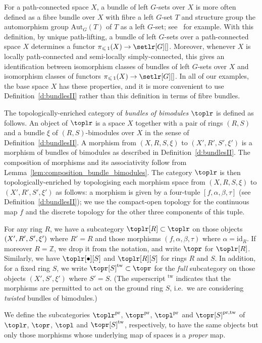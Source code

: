 \documentclass[AHL,Unicode,published]{cedram}
\newcommand{\Aut}{\mathrm{Aut}}
\newcommand{\pr}{\ensuremath{\mathrm{pr}}}
\newcommand{\id}{\mathrm{id}}
\newcommand{\tw}{\mathrm{tw}}
\newcommand{\bZ}{\mathbb{Z}}
\renewcommand{\leq}{\leqslant}
\begin{document}
\begin{rema}\label{r:bundles}
For a path-connected space $X$, a bundle of left $G$-sets over $X$ is more often defined as a fibre bundle over $X$ with fibre a left $G$-set $T$ and structure group the automorphism group $\Aut_G(T)$ of $T$ as a left $G$-set; see~\cite[\S~2]{Steenrod1951} for example. With this definition, by unique path-lifting, a bundle of left $G$-sets over a path-connected space $X$ determines a functor $\pi_{\leq\,1}(X) \to \setlr[G][]$. Moreover, whenever $X$ is locally path-connected and semi-locally simply-connected, this gives an identification between isomorphism classes of bundles of left $G$-sets over $X$ and isomorphism classes of functors $\pi_{\leq\,1}(X) \to \setlr[G][]$. In all of our examples, the base space $X$ has these properties, and it is more convenient to use Definition~\ref{d:bundlesII} rather than this definition in terms of fibre bundles.
\end{rema}

\begin{defi}\label{def:bundles_of_bimodules}
The topologically-enriched category of \emph{bundles of bimodules} $\toplr$ is defined as follows. An object of $\toplr$ is a space $X$ together with a pair of rings $(R,S)$ and a bundle $\xi$ of $(R,S)$-bimodules over $X$ in the sense of Definition~\ref{d:bundlesII}. A morphism from $(X,R,S,\xi)$ to $(X',R',S',\xi')$ is a morphism of bundles of bimodules as described in Definition~\ref{d:bundlesII}. The composition of morphisms and its associativity follow from Lemma~\ref{lem:composition_bundle_bimodules}. The category $\toplr$ is then topologically-enriched by topologising each morphism space from $(X,R,S,\xi)$ to $(X',R',S',\xi')$ as follows: a morphism is given by a four-tuple $[f,\alpha,\beta,\tau]$ (see Definition~\ref{d:bundlesII}); we use the compact-open topology for the continuous map $f$ and the discrete topology for the other three components of this tuple.

For any ring $R$, we have a subcategory $\toplr[R] \subset \toplr$ on those objects $(X',R',S',\linebreak\xi')$ where $R'=R$ and those morphisms $(f,\alpha,\beta,\tau)$ where $\alpha = \id_R$. If moreover $R=\bZ$, we drop it from the notation, and write $\topr$ for $\toplr[R]$. Similarly, we have $\toplr[\bullet][S]$ and $\toplr[R][S]$ for rings $R$ and $S$. In addition, for a fixed ring $S$, we write $\topr[S]^{\tw} \subset \topr$ for the \emph{full} subcategory on those objects $(X',S',\xi')$ where $S'=S$. (The superscript ${}^{\tw}$ indicates that the morphisms are permitted to act on the ground ring $S$, i.e.~we are considering \emph{twisted} bundles of bimodules.)

We define the subcategories $\toplr^{\pr}$, $\topr^{\pr}$, $\topl^{\pr}$ and $\topr[S]^{\pr,\tw}$ of $\toplr$, $\topr$, $\topl$ and $\topr[S]^{\tw}$, respectively, to have the same objects but only those morphisms whose underlying map of spaces is a \emph{proper} map.
\end{defi}
\end{document}
